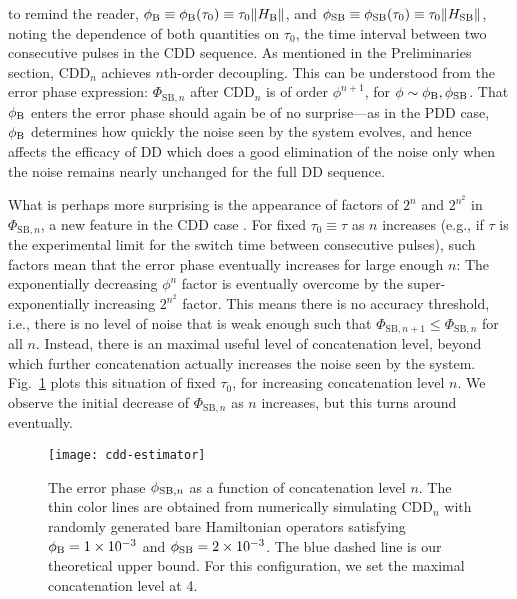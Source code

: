 \documentclass[pra,reprint,superscriptaddress]{revtex4-2}
\newcommand{\HB}{H_\mathrm{B}}
\newcommand{\HSB}{H_\mathrm{SB}}
\newcommand{\CDDn}{\mathrm{CDD}_n}
\begin{document}
to remind the reader, $\phi_\rB\equiv\phi_\rB(\tau_0)\equiv\tau_0\Vert \HB\Vert$, and $\phi_\rSB\equiv\phi_\rSB(\tau_0)\equiv\tau_0\Vert\HSB\Vert$, noting the dependence of both quantities on $\tau_0$, the time interval between two consecutive pulses in the CDD sequence.  As mentioned in the Preliminaries section, $\CDDn$ achieves $n$th-order decoupling. This can be understood from the error phase expression: $\Phi_{\mathrm{SB},n}$ after $\CDDn$ is of order $\phi^{n+1}$, for $\phi\sim\phi_{\mathrm{B}}, \phi_{\mathrm{SB}}$. That $\phi_{\mathrm{B}}$ enters the error phase should again be of no surprise---as in the PDD case, $\phi_{\mathrm{B}}$ determines how quickly the noise seen by the system evolves, and hence affects the efficacy of DD which does a good elimination of the noise only when the noise remains nearly unchanged for the full DD sequence. 

What is perhaps more surprising is the appearance of factors of $2^n$ and $2^{n^2}$ in $\Phi_{\mathrm{SB},n}$, a new feature in the CDD case . For fixed $\tau_0\equiv \tau$ as $n$ increases (e.g., if $\tau$ is the experimental limit for the switch time between consecutive pulses), such factors mean that the error phase eventually increases for large enough $n$: The exponentially decreasing $\phi^n$ factor is eventually overcome by the super-exponentially increasing $2^{n^2}$ factor. This means there is no accuracy threshold, i.e., there is no level of noise that is weak enough such that $\Phi_{\mathrm{SB},n+1}\leq\Phi_{\mathrm{SB},n}$ for all $n$. Instead, there is an maximal useful level of concatenation level, beyond which further concatenation actually increases the noise seen by the system. Fig.~\ref{fig:estimator-size} plots this situation of fixed $\tau_0$, for increasing concatenation level $n$. We observe the initial decrease of $\Phi_{\mathrm{SB},n}$ as $n$ increases, but this turns around eventually. 

\begin{figure}
    \texttt{[image: cdd-estimator]}
    \caption{The error phase $\phi_{\mathrm{SB},n}$ as a function of concatenation level $n$. 
    The thin color lines are obtained from numerically simulating $\CDDn$ with randomly generated bare Hamiltonian operators satisfying $\phi_{\mathrm{B}}=1\times10^{-3}$ and $\phi_{\mathrm{SB}}=2\times 10^{-3}$. The blue dashed line is our theoretical upper bound. For this configuration, we set the maximal concatenation level at 4.}
    \label{fig:estimator-size}
\end{figure}
\end{document}
